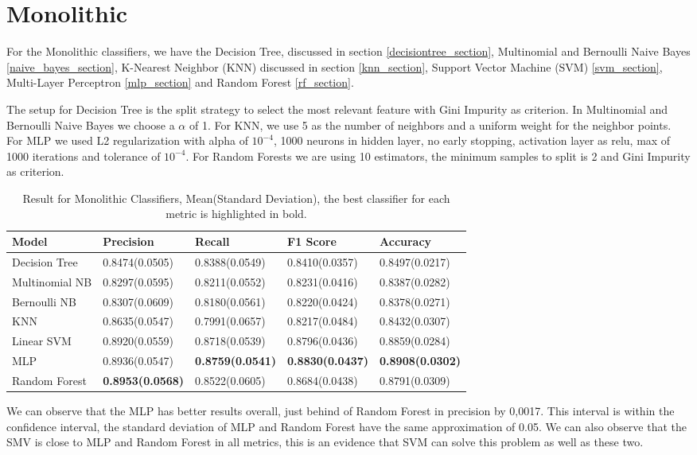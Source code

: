\section{Monolithic}\label{mono}

For the Monolithic classifiers, we have the Decision Tree, discussed in section \ref{decisiontree_section}, Multinomial and Bernoulli Naive Bayes \ref{naive_bayes_section}, K-Nearest Neighbor (KNN) discussed in section \ref{knn_section}, Support Vector Machine (SVM) \ref{svm_section}, Multi-Layer Perceptron \ref{mlp_section} and Random Forest \ref{rf_section}.

The setup for Decision Tree is the split strategy to select the most relevant feature with Gini Impurity as criterion. In Multinomial and Bernoulli Naive Bayes we choose a $\alpha$ of 1. For KNN, we use 5 as the number of neighbors and a uniform weight for the neighbor points. For MLP we used L2 regularization with alpha of $10^{-4}$, 1000 neurons in hidden layer, no early stopping, activation layer as relu, max of 1000 iterations and tolerance of $10^{-4}$. For Random Forests we are using 10 estimators, the minimum samples to split is 2 and Gini Impurity as criterion.

\begin{table}[h!]
    \centering
    \renewcommand{\arraystretch}{1.8}
    \begin{tabular}{ |p{3cm}|p{2.6cm}p{2.6cm}p{2.6cm}p{2.6cm}| }
        \hline
        Model & Precision & Recall & F1 Score & Accuracy \\
        \hline
        Decision Tree & 0.8474(0.0505) & 0.8388(0.0549) & 0.8410(0.0357) & 0.8497(0.0217) \\
        Multinomial NB & 0.8297(0.0595) & 0.8211(0.0552) & 0.8231(0.0416) & 0.8387(0.0282) \\
        Bernoulli NB & 0.8307(0.0609) & 0.8180(0.0561) & 0.8220(0.0424) & 0.8378(0.0271) \\
        KNN & 0.8635(0.0547) & 0.7991(0.0657) & 0.8217(0.0484) & 0.8432(0.0307) \\
        Linear SVM & 0.8920(0.0559) & 0.8718(0.0539) & 0.8796(0.0436) & 0.8859(0.0284) \\
        MLP & 0.8936(0.0547) & \textbf{0.8759(0.0541)} & \textbf{0.8830(0.0437)} & \textbf{0.8908(0.0302)} \\
        Random Forest & \textbf{0.8953(0.0568)} & 0.8522(0.0605) & 0.8684(0.0438) & 0.8791(0.0309) \\ [1ex]
        \hline
        \end{tabular}
        \caption{%
        Result for Monolithic Classifiers, Mean(Standard Deviation), the best classifier for each metric is highlighted in bold.%
        }\label{mcs_perceptron_table}
\end{table}

We can observe that the MLP has better results overall, just behind of Random Forest in precision by 0,0017. This interval is within the confidence interval, the standard deviation of MLP and Random Forest have the same approximation of 0.05. We can also observe that the SMV is close to MLP and Random Forest in all metrics, this is an evidence that SVM can solve this problem as well as these two.